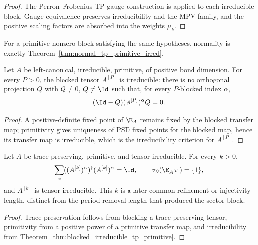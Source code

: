 \begin{proof}\leanok
    The Perron--Frobenius TP-gauge construction is applied to each irreducible
    block. Gauge equivalence preserves irreducibility and the MPV family, and the
    positive scaling factors are absorbed into the weights $\mu_k$.
\end{proof}

For a primitive nonzero block satisfying the same hypotheses, normality is
exactly Theorem~\ref{thm:normal_tp_primitive_irred}.

\begin{theorem}%
    \label{thm:blocked_irreducible_tp_primitive}
    \leanok
    Let $A$ be left-canonical, irreducible, primitive, of positive bond
    dimension. For every $P>0$, the blocked tensor $A^{[P]}$ is irreducible:
    there is no orthogonal projection $Q$ with $Q \ne 0$, $Q \ne \Id$ such that,
    for every $P$-blocked index $\alpha$,
    \[
        (\Id-Q)(A^{[P]})^\alpha Q=0.
    \]
\end{theorem}

\begin{proof}\leanok
    A positive-definite fixed point of $\E_A$ remains fixed by the blocked transfer
    map; primitivity gives uniqueness of PSD fixed points for the blocked map,
    hence its transfer map is irreducible, which is the irreducibility criterion
    for $A^{[P]}$.
\end{proof}

\begin{theorem}%
    \label{thm:tp_primitive_irreducible_extra_blocking}
    \leanok
    Let $A$ be trace-preserving, primitive, and tensor-irreducible. For every
    $k>0$,
    \[
        \sum_\alpha ((A^{[k]})^\alpha)^\dagger
        (A^{[k]})^\alpha = \Id,
        \qquad
        \sigma_\partial(\E_{A^{[k]}})=\{1\},
    \]
    and $A^{[k]}$ is tensor-irreducible. This $k$ is a later
    common-refinement or injectivity length, distinct from the period-removal
    length that produced the sector block.
\end{theorem}

\begin{proof}\leanok
    Trace preservation follows from blocking a trace-preserving tensor,
    primitivity from a positive power of a primitive transfer map, and
    irreducibility from Theorem~\ref{thm:blocked_irreducible_tp_primitive}.
\end{proof}

